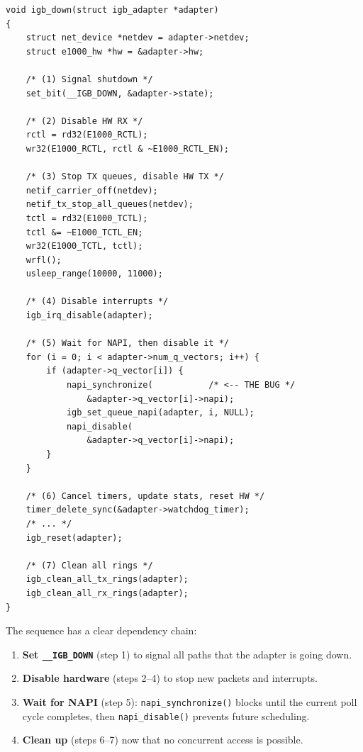 \documentclass[11pt,a4paper,openany]{book}
\newcommand{\func}[1]{\texttt{#1()}}
\newcommand{\flag}[1]{\texttt{#1}}
\begin{document}
\begin{lstlisting}[caption={\texttt{igb\_down()} (igb\_main.c:2170), before the fix},
    label=lst:igb-down]
void igb_down(struct igb_adapter *adapter)
{
    struct net_device *netdev = adapter->netdev;
    struct e1000_hw *hw = &adapter->hw;

    /* (1) Signal shutdown */
    set_bit(__IGB_DOWN, &adapter->state);

    /* (2) Disable HW RX */
    rctl = rd32(E1000_RCTL);
    wr32(E1000_RCTL, rctl & ~E1000_RCTL_EN);

    /* (3) Stop TX queues, disable HW TX */
    netif_carrier_off(netdev);
    netif_tx_stop_all_queues(netdev);
    tctl = rd32(E1000_TCTL);
    tctl &= ~E1000_TCTL_EN;
    wr32(E1000_TCTL, tctl);
    wrfl();
    usleep_range(10000, 11000);

    /* (4) Disable interrupts */
    igb_irq_disable(adapter);

    /* (5) Wait for NAPI, then disable it */
    for (i = 0; i < adapter->num_q_vectors; i++) {
        if (adapter->q_vector[i]) {
            napi_synchronize(           /* <-- THE BUG */
                &adapter->q_vector[i]->napi);
            igb_set_queue_napi(adapter, i, NULL);
            napi_disable(
                &adapter->q_vector[i]->napi);
        }
    }

    /* (6) Cancel timers, update stats, reset HW */
    timer_delete_sync(&adapter->watchdog_timer);
    /* ... */
    igb_reset(adapter);

    /* (7) Clean all rings */
    igb_clean_all_tx_rings(adapter);
    igb_clean_all_rx_rings(adapter);
}
\end{lstlisting}

The sequence has a clear dependency chain:

\begin{enumerate}
\item \textbf{Set \flag{\_\_IGB\_DOWN}} (step 1) to signal all paths that
    the adapter is going down.
\item \textbf{Disable hardware} (steps 2--4) to stop new packets and
    interrupts.
\item \textbf{Wait for NAPI} (step 5): \func{napi\_synchronize} blocks
    until the current poll cycle completes, then \func{napi\_disable}
    prevents future scheduling.
\item \textbf{Clean up} (steps 6--7) now that no concurrent access is
    possible.
\end{enumerate}
\end{document}
